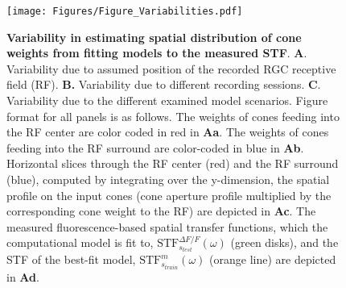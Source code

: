 \documentclass[11pt, oneside]{article}   	%
\begin{document}
\begin{figure}[htbp] %
   \centering
   \texttt{[image: Figures/Figure\_Variabilities.pdf]} 
   \caption{\textbf{Variability in estimating spatial distribution of cone weights from fitting models to the measured STF}. \textbf{A}. Variability due to assumed position of the recorded RGC receptive field (RF). \textbf{B.} Variability due to different recording sessions. \textbf{C}. Variability due to the different examined model scenarios. Figure format for all panels is as follows. The weights of cones feeding into the RF center are color coded in red in \textbf{Aa}. The weights of cones feeding into the RF surround are color-coded in blue in \textbf{Ab}. Horizontal slices through the RF center (red) and the RF surround (blue), computed by integrating over the y-dimension, the spatial profile on the input cones (cone aperture profile multiplied by the corresponding cone weight to the RF) are depicted in \textbf{Ac}. The measured fluorescence-based spatial transfer functions, which the computational model is fit to, $\mbox{STF}^{\Delta F / F}_{s_{test}}(\omega)$ (green disks), and the STF of the best-fit model, $\mbox{STF}^{m}_{s_{train}}(\omega)$ (orange line) are depicted in \textbf{Ad}.
}
   \label{fig:Variabilities}
\end{figure}
\end{document}
